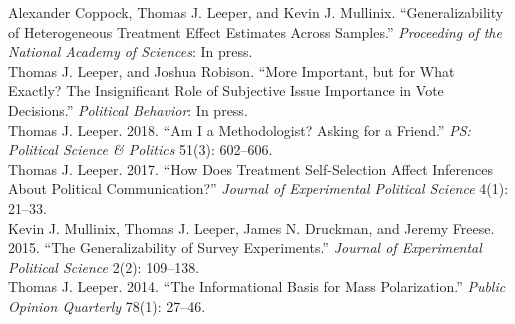 \documentclass[12pt]{article}
\renewcommand{\section}[1]{\pagebreak[3]%
    \llap{\scshape\smash{\parbox[t]{\marginparwidth}{\raggedright {\color{black}#1}}}}%
    \vspace{-\baselineskip}\par}
\newcommand{\entry}[1]{\indent {\color{lg}\guillemotright}\hspace{2pt}#1\vspace{.25em}\\}
\newcommand{\hzline}[0]{\noindent\makebox[\linewidth]{\rule{\textwidth}{0.4pt}}}
\begin{document}
\clearpage

\hzline

\section{Selected\\Peer-Reviewed\\Publications}

	\entry{Alexander Coppock, Thomas J. Leeper, and Kevin J. Mullinix. ``Generalizability of Heterogeneous Treatment Effect Estimates Across Samples.'' \textit{Proceeding of the National Academy of Sciences}: In press.}
	\entry{Thomas J. Leeper, and Joshua Robison. ``More Important, but for What Exactly? The Insignificant Role of Subjective Issue Importance in Vote Decisions.'' \textit{Political Behavior}: In press.}
	\entry{Thomas J. Leeper. 2018. ``Am I a Methodologist? Asking for a Friend.'' \textit{PS: Political Science \& Politics} 51(3): 602--606.}
    \entry{Thomas J. Leeper. 2017. ``How Does Treatment Self-Selection Affect Inferences About Political Communication?'' \textit{Journal of Experimental Political Science} 4(1): 21--33.}	
	\entry{Kevin J. Mullinix, Thomas J. Leeper, James N. Druckman, and Jeremy Freese. 2015. ``The Generalizability of Survey Experiments.'' {\em Journal of Experimental Political Science} 2(2): 109--138.}
	\entry{Thomas J. Leeper. 2014. ``The Informational Basis for Mass Polarization.'' {\em Public Opinion Quarterly} 78(1): 27--46.}
\end{document}
